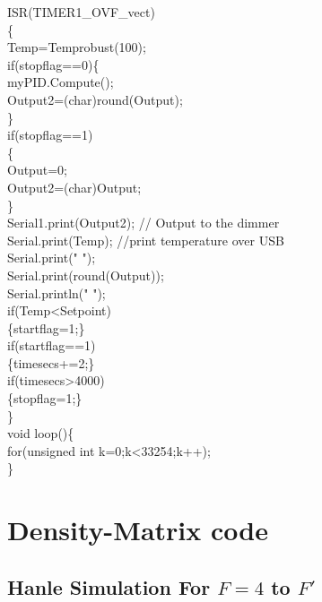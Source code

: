 \noindent ISR(TIMER1\_OVF\_vect)\\
\{\\
	Temp=Temprobust(100);\\
	if(stopflag==0)\{\\
		myPID.Compute();\\
		Output2=(char)round(Output);\\
	\}\\
	if(stopflag==1)\\
	\{\\
		Output=0;\\
		Output2=(char)Output;\\
	\}\\
	Serial1.print(Output2);  // Output to the dimmer  \\
	Serial.print(Temp);  //print temperature over USB\\
	Serial.print("  ");\\
	Serial.print(round(Output));\\
	Serial.println(" ");\\
	if(Temp\textless Setpoint)\\
	\{startflag=1;\}\\
	if(startflag==1)\\
	\{timesecs+=2;\}\\
	if(timesecs\textgreater 4000)\\
	\{stopflag=1;\}\\
\}\\

\noindent void loop()\{\\
	for(unsigned int k=0;k\textless 33254;k++);\\
\}


\chapter{Density-Matrix code}

\section{Hanle Simulation For $F=4$ to $F'$}

